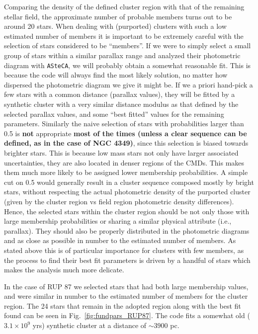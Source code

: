 \documentclass[draft]{aa}
\begin{document}
Comparing the density of the defined cluster region with that of the
remaining stellar field, the approximate number of probable members turns out
to be around 20 stars.
%
When dealing with (purported) clusters with such a low estimated number of
members it is important to be extremely careful with the selection of stars
considered to be ``members''. If we were to simply select a small group
of stars within a similar parallax range and analyzed their photometric
diagram with \texttt{ASteCA}, we will probably obtain a somewhat reasonable
fit. This is because the code will always find the most likely solution,
no matter how dispersed the photometric diagram we give it might be. If we a
priori hand-pick a few stars with a common distance (parallax values), they
will be fitted by a synthetic cluster with a very similar distance modulus as
that defined by the selected parallax values, and some ``best fitted'' values
for the remaining parameters.
%
Similarly the naive selection of stars with probabilities larger than 0.5 is
\textbf{not} appropriate \textbf{most of the times (unless a clear sequence can
be defined, as in the case of NGC 4349)}, since this selection is biased
towards brighter stars.
This is because low mass stars not only have larger associated uncertainties,
they are also located in denser regions of the CMDs. This makes them much more
likely to be assigned lower membership probabilities. A simple cut on 0.5
would generally result in a cluster sequence composed mostly by bright stars,
without respecting the actual photometric density of the purported cluster 
(given by the cluster region vs field region photometric density differences).
%
Hence, the selected stars within the cluster region should be not only those
with large membership probabilities or sharing a similar physical attribute 
(i.e., parallax). They should also be properly distributed in the photometric
diagrams and as close as possible in number to the estimated number of members.
As stated above this is of particular importance for clusters with few members,
as the process to find their best fit parameters is driven by a handful of
stars which makes the analysis much more delicate.

In the case of RUP 87 we selected stars that had both large membership
values, and were similar in number to the estimated number of members for the
cluster region. The 24 stars that remain in the adopted region along with the
best fit found can be seen in Fig.~\ref{fig:fundpars_RUP87}. The code fits a
somewhat old ($3.1\times10^9$ yrs) synthetic cluster at a distance of
$\sim3900$ pc.\\
\end{document}
